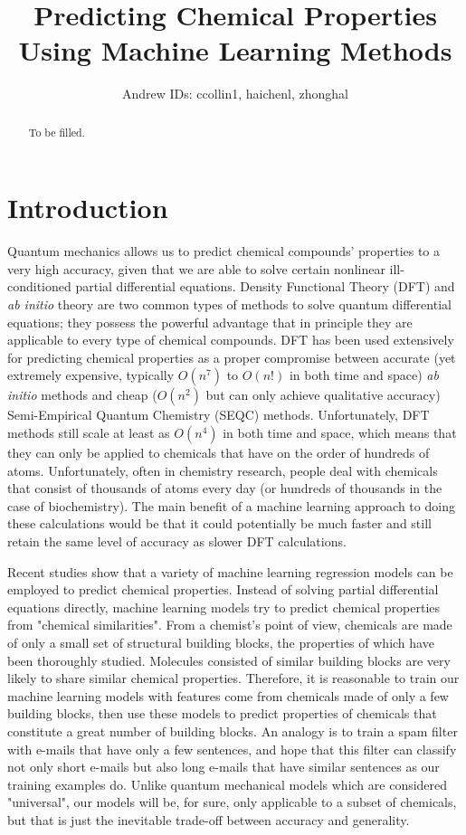 \documentclass[12pt, oneside]{article}   	%
\title{Predicting Chemical Properties Using Machine Learning Methods}
\author{Andrew IDs: ccollin1, haichenl, zhonghal}
\begin{document}
\maketitle

\begin{abstract}
To be filled.    
\end{abstract}
\section{Introduction}
\noindent Quantum mechanics allows us to predict chemical compounds' properties to a very high accuracy, given that we are able to solve certain nonlinear ill-conditioned partial differential equations. Density Functional Theory (DFT) and \textit{ab initio} theory are two common types of methods to solve quantum differential equations; they possess the powerful advantage that in principle they are applicable to every type of chemical compounds. DFT has been used extensively for predicting chemical properties as a proper compromise between accurate (yet extremely expensive, typically $O(n^7)$ to $O(n!)$ in both time and space) \textit{ab initio} methods and cheap ($O(n^2)$ but can only achieve qualitative accuracy) Semi-Empirical Quantum Chemistry (SEQC) methods. Unfortunately, DFT methods still scale at least as $O(n^4)$ in both time and space, which means that they can only be applied to chemicals that have on the order of hundreds of atoms. Unfortunately, often in chemistry research, people deal with chemicals that consist of thousands of atoms every day (or hundreds of thousands in the case of biochemistry). The main benefit of a machine learning approach to doing these calculations would be that it could potentially be much faster and still retain the same level of accuracy as slower DFT calculations.

Recent studies show that a variety of machine learning regression models can be employed to predict chemical properties. Instead of solving partial differential equations directly, machine learning models try to predict chemical properties from "chemical similarities". From a chemist's point of view, chemicals are made of only a small set of structural building blocks, the properties of which have been thoroughly studied. Molecules consisted of similar building blocks are very likely to share similar chemical properties. Therefore, it is reasonable to train our machine learning models with features come from chemicals made of only a few building blocks, then use these models to predict properties of chemicals that constitute a great number of building blocks. An analogy is to train a spam filter with e-mails that have only a few sentences, and hope that this filter can classify not only short e-mails but also long e-mails that have similar sentences as our training examples do. Unlike quantum mechanical models which are considered "universal", our models will be, for sure, only applicable to a subset of chemicals, but that is just the inevitable trade-off between accuracy and generality. \\
\end{document}
